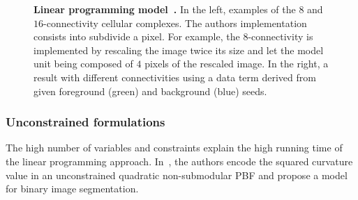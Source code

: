 \begin{figure}
\begin{minipage}{0.25\textwidth}
\end{minipage}%
\begin{minipage}{0.75\textwidth}
\center
{}
\end{minipage}%
\caption{\textbf{Linear programming model~\cite{schoenemann09linear}.} In the left, examples of the $8$ and $16$-connectivity cellular complexes. The authors implementation consists into subdivide a pixel. For example, the $8$-connectivity is implemented by rescaling the image twice its size and let the model unit being composed of $4$ pixels of the rescaled image. In the right, a result with different connectivities using a data term derived from given foreground (green) and background (blue) seeds. }
\end{figure}

\subsubsection{Unconstrained formulations}

The high number of variables and constraints explain the high running time of the linear programming approach. In~\cite{zehiry10fast}, the authors encode the squared curvature value in an unconstrained quadratic non-submodular PBF and propose a model for binary image segmentation.

